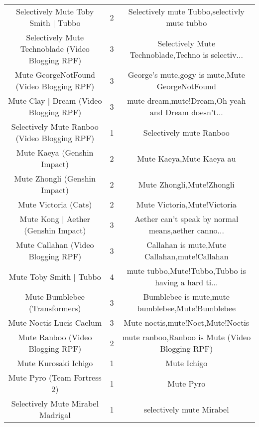 \begin{table}[h!]
{\begin{tabular}{|c|c|c|}
               Selectively Mute Toby Smith | Tubbo &      2 &       Selectively mute Tubbo,selectivly mute tubbo \\
 Selectively Mute Technoblade (Video Blogging RPF) &      3 & Selectively Mute Technoblade,Techno is selectiv... \\
          Mute GeorgeNotFound (Video Blogging RPF) &      3 &     George's mute,gogy is mute,Mute GeorgeNotFound \\
            Mute Clay | Dream (Video Blogging RPF) &      3 & mute dream,mute!Dream,Oh yeah and Dream doesn’t... \\
      Selectively Mute Ranboo (Video Blogging RPF) &      1 &                            Selectively mute Ranboo \\
                       Mute Kaeya (Genshin Impact) &      2 &                           Mute Kaeya,Mute Kaeya au \\
                     Mute Zhongli (Genshin Impact) &      2 &                          Mute Zhongli,Mute!Zhongli \\
                              Mute Victoria (Cats) &      2 &                        Mute Victoria,Mute!Victoria \\
               Mute Kong | Aether (Genshin Impact) &      3 & Aether can't speak by normal means,aether canno... \\
                Mute Callahan (Video Blogging RPF) &      3 &       Callahan is mute,Mute Callahan,mute!Callahan \\
                           Mute Toby Smith | Tubbo &      4 & mute tubbo,Mute!Tubbo,Tubbo is having a hard ti... \\
                     Mute Bumblebee (Transformers) &      3 &    Bumblebee is mute,mute bumblebee,Mute!Bumblebee \\
                          Mute Noctis Lucis Caelum &      3 &                  Mute noctis,mute!Noct,Mute!Noctis \\
                  Mute Ranboo (Video Blogging RPF) &      2 &    mute ranboo,Ranboo is Mute (Video Blogging RPF) \\
                              Mute Kurosaki Ichigo &      1 &                                        Mute Ichigo \\
                       Mute Pyro (Team Fortress 2) &      1 &                                          Mute Pyro \\
                 Selectively Mute Mirabel Madrigal &      1 &                           selectively mute Mirabel \\

\end{tabular}}
\end{table}
